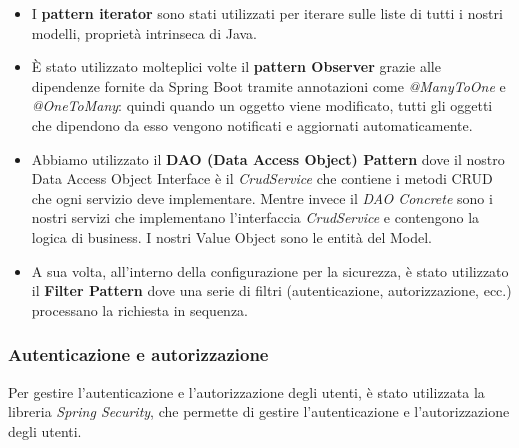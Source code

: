 \documentclass[a4paper]{article}
\begin{document}
\begin{itemize}
  \item I \textbf{pattern iterator} sono stati utilizzati per iterare sulle liste di tutti i nostri modelli, proprietà intrinseca
  di Java. 
  \item È stato utilizzato molteplici volte il \textbf{pattern Observer} grazie alle dipendenze fornite da Spring Boot 
  tramite annotazioni come \textit{@ManyToOne} e \textit{@OneToMany}: quindi quando un oggetto viene modificato,
  tutti gli oggetti che dipendono da esso vengono notificati e aggiornati automaticamente.
  \item Abbiamo utilizzato il \textbf{DAO (Data Access Object) Pattern} dove il nostro Data Access Object Interface
  è il \textit{CrudService} che contiene i metodi CRUD che ogni servizio deve implementare.
  Mentre invece il \textit{DAO Concrete} sono i nostri servizi che implementano l'interfaccia \textit{CrudService} e contengono la logica di business.
  I nostri Value Object sono le entità del Model.
  \item A sua volta, all'interno della configurazione per la sicurezza, è stato utilizzato il \textbf{Filter Pattern}
  dove una serie di filtri (autenticazione, autorizzazione, ecc.) processano la richiesta in sequenza.
\end{itemize}

\subsubsection{Autenticazione e autorizzazione}

Per gestire l'autenticazione e l'autorizzazione degli utenti, è stato utilizzata la libreria \textit{Spring Security}, che permette di gestire
l'autenticazione e l'autorizzazione degli utenti. 
\end{document}
